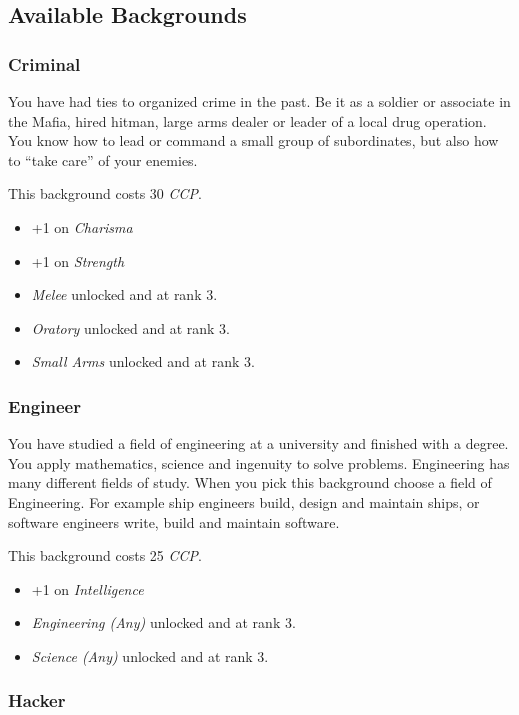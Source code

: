 \subsection{Available Backgrounds}

\subsubsection{Criminal}

You have had ties to organized crime in the past. Be it as a soldier or
associate in the Mafia, hired hitman, large arms dealer or leader of a
local drug operation. You know how to lead or command a small group of
subordinates, but also how to ``take care'' of your enemies.

This background costs 30 \emph{CCP}.

\begin{itemize}
\item +1 on \emph{Charisma}
\item +1 on \emph{Strength}
\item \emph{Melee} unlocked and at rank 3.
\item \emph{Oratory} unlocked and at rank 3.
\item \emph{Small Arms} unlocked and at rank 3.
\end{itemize}

\subsubsection{Engineer}

You have studied a field of engineering at a university and finished with
a degree. You apply mathematics, science and ingenuity to solve problems.
Engineering has many different fields of study. When you pick this background
choose a field of Engineering. For example ship engineers build, design and
maintain ships, or software engineers write, build and maintain software.

This background costs 25 \emph{CCP}.

\begin{itemize}
\item +1 on \emph{Intelligence}
\item \emph{Engineering (Any)} unlocked and at rank 3.
\item \emph{Science (Any)} unlocked and at rank 3.
\end{itemize}

\subsubsection{Hacker}

